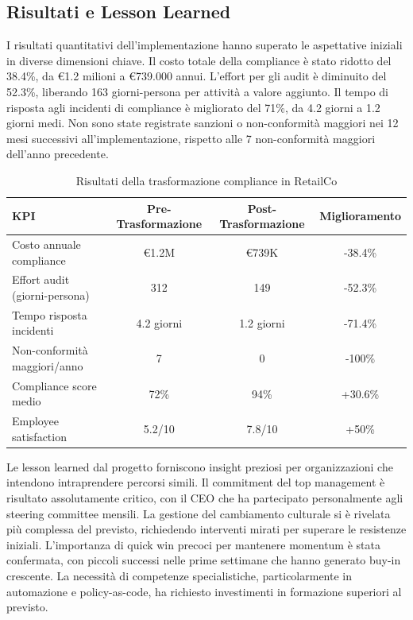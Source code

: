 \subsection{Risultati e Lesson Learned}

I risultati quantitativi dell'implementazione hanno superato le aspettative iniziali in diverse dimensioni chiave. Il costo totale della compliance è stato ridotto del 38.4\%, da €1.2 milioni a €739.000 annui. L'effort per gli audit è diminuito del 52.3\%, liberando 163 giorni-persona per attività a valore aggiunto. Il tempo di risposta agli incidenti di compliance è migliorato del 71\%, da 4.2 giorni a 1.2 giorni medi. Non sono state registrate sanzioni o non-conformità maggiori nei 12 mesi successivi all'implementazione, rispetto alle 7 non-conformità maggiori dell'anno precedente.

\begin{table}[h]
\centering
\caption{Risultati della trasformazione compliance in RetailCo}
\label{tab:risultati_retailco}
\begin{tabular}{|l|c|c|c|}
\hline
\textbf{KPI} & \textbf{Pre-Trasformazione} & \textbf{Post-Trasformazione} & \textbf{Miglioramento} \\
\hline
Costo annuale compliance & €1.2M & €739K & -38.4\% \\
Effort audit (giorni-persona) & 312 & 149 & -52.3\% \\
Tempo risposta incidenti & 4.2 giorni & 1.2 giorni & -71.4\% \\
Non-conformità maggiori/anno & 7 & 0 & -100\% \\
Compliance score medio & 72\% & 94\% & +30.6\% \\
Employee satisfaction & 5.2/10 & 7.8/10 & +50\% \\
\hline
\end{tabular}
\end{table}

Le lesson learned dal progetto forniscono insight preziosi per organizzazioni che intendono intraprendere percorsi simili. Il commitment del top management è risultato assolutamente critico, con il CEO che ha partecipato personalmente agli steering committee mensili. La gestione del cambiamento culturale si è rivelata più complessa del previsto, richiedendo interventi mirati per superare le resistenze iniziali. L'importanza di quick win precoci per mantenere momentum è stata confermata, con piccoli successi nelle prime settimane che hanno generato buy-in crescente. La necessità di competenze specialistiche, particolarmente in automazione e policy-as-code, ha richiesto investimenti in formazione superiori al previsto.

